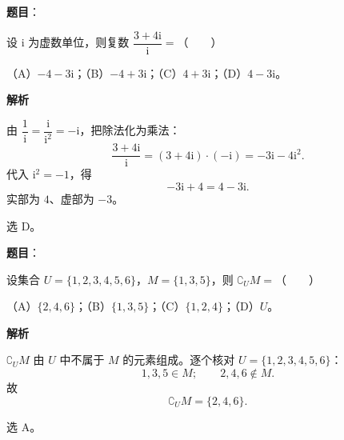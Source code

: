 

\begin{answer}

\textbf{题目}：

设 $\mathrm i$ 为虚数单位，则复数 $\dfrac{3+4\mathrm i}{\mathrm i}=$\mbox{（　　）}

（A）$-4-3\mathrm i$；（B）$-4+3\mathrm i$；（C）$4+3\mathrm i$；（D）$4-3\mathrm i$。

\textbf{解析}

由 $\dfrac1{\mathrm i}=\dfrac{\mathrm i}{\mathrm i^2}=-\mathrm i$，把除法化为乘法：
\nopagebreak[4]
\[\frac{3+4\mathrm i}{\mathrm i}=(3+4\mathrm i)\cdot(-\mathrm i)=-3\mathrm i-4\mathrm i^2.\]
代入 $\mathrm i^2=-1$，得
\nopagebreak[4]
\[-3\mathrm i+4=4-3\mathrm i.\]
实部为 $4$、虚部为 $-3$。

选 D。


\end{answer}
\begin{answer}

\textbf{题目}：

设集合 $U=\{1,2,3,4,5,6\}$，$M=\{1,3,5\}$，则 $\complement_U M=$\mbox{（　　）}

（A）$\{2,4,6\}$；（B）$\{1,3,5\}$；（C）$\{1,2,4\}$；（D）$U$。

\textbf{解析}

$\complement_U M$ 由 $U$ 中不属于 $M$ 的元素组成。逐个核对 $U=\{1,2,3,4,5,6\}$：
\nopagebreak[4]
\[1,3,5\in M;\qquad 2,4,6\notin M.\]
故
\nopagebreak[4]
\[\complement_U M=\{2,4,6\}.\]

选 A。


\end{answer}
